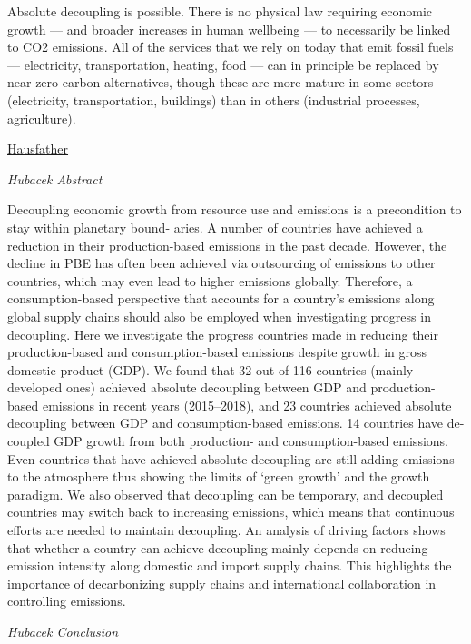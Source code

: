\documentclass[
]{book}
\begin{document}
Absolute decoupling is possible. There is no physical law requiring economic growth --- and broader increases in human wellbeing --- to necessarily be linked to CO2 emissions. All of the services that we rely on today that emit fossil fuels --- electricity, transportation, heating, food --- can in principle be replaced by near-zero carbon alternatives, though these are more mature in some sectors (electricity, transportation, buildings) than in others (industrial processes, agriculture).

\href{https://thebreakthrough.org/issues/energy/absolute-decoupling-of-economic-growth-and-emissions-in-32-countries}{Hausfather}

\emph{Hubacek Abstract}

Decoupling economic growth from resource use and emissions is a precondition to stay within planetary bound-
aries. A number of countries have achieved a reduction in their production-based emissions in the past decade.
However, the decline in PBE has often been achieved via outsourcing of emissions to other countries, which may
even lead to higher emissions globally. Therefore, a consumption-based perspective that accounts for a country's
emissions along global supply chains should also be employed when investigating progress in decoupling. Here
we investigate the progress countries made in reducing their production-based and consumption-based emissions
despite growth in gross domestic product (GDP). We found that 32 out of 116 countries (mainly developed ones)
achieved absolute decoupling between GDP and production-based emissions in recent years (2015--2018), and 23
countries achieved absolute decoupling between GDP and consumption-based emissions. 14 countries have de-
coupled GDP growth from both production- and consumption-based emissions. Even countries that have achieved
absolute decoupling are still adding emissions to the atmosphere thus showing the limits of `green growth' and
the growth paradigm. We also observed that decoupling can be temporary, and decoupled countries may switch
back to increasing emissions, which means that continuous eﬀorts are needed to maintain decoupling. An analysis
of driving factors shows that whether a country can achieve decoupling mainly depends on reducing emission
intensity along domestic and import supply chains. This highlights the importance of decarbonizing supply chains
and international collaboration in controlling emissions.

\emph{Hubacek Conclusion}
\end{document}
